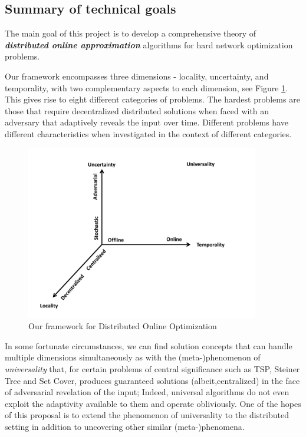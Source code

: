 \subsection{Summary of technical goals}
\label{sec:goals}

The main goal of this project is to develop a comprehensive theory of
{\bf \em distributed online approximation}\/ algorithms for hard network
optimization problems.

Our framework encompasses three dimensions - locality, uncertainty, and temporality,
with two complementary aspects to each dimension, see Figure \ref{fig:dimensions}.
This gives rise to eight different categories of problems.
The hardest problems are those that require decentralized distributed solutions when
faced with an adversary that adaptively reveals the input over time. Different
problems have different characteristics when investigated in the context of
different categories. 

\begin{figure}
\centering
\includegraphics[width=4in]{dimensions-rev.pdf}
\caption{Our framework for Distributed Online Optimization}
\label{fig:dimensions}
\end{figure}

In some fortunate circumstances, we can find solution
concepts that can handle multiple dimensions simultaneously as with the
(meta-)phenomenon of {\em universality} \cite{jia+lnrs:universal} that, for certain problems of central significance such as TSP, Steiner Tree and Set Cover, produces guaranteed solutions
(albeit,centralized)
in the face of adversarial revelation of the input; Indeed, universal algorithms
do not even exploit the adaptivity available to them and operate obliviously.
One of the hopes of this proposal is to extend the phenomenon of universality to
the distributed setting in addition to uncovering other similar (meta-)phenomena.


